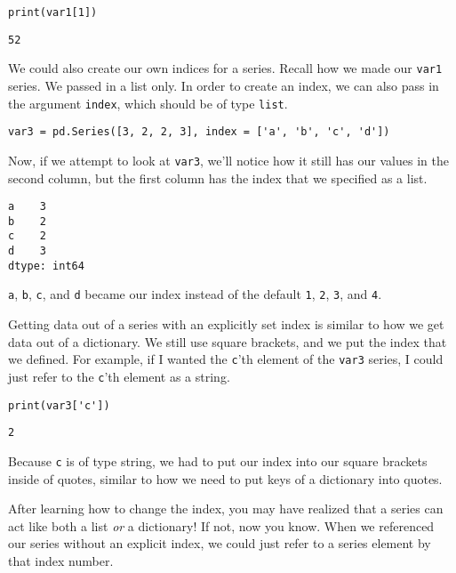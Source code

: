 \begin{lstlisting}[style=pippython]
print(var1[1])
\end{lstlisting}
\begin{lstlisting}
52
\end{lstlisting}\par
{}\par
We could also create our own indices for a series. Recall how we made our \verb|var1| series. We passed in a list only. In order to create an index, we can also pass in the argument \verb|index|, which should be of type \verb|list|.\par
\begin{lstlisting}[style=pippython]
var3 = pd.Series([3, 2, 2, 3], index = ['a', 'b', 'c', 'd'])
\end{lstlisting}
Now, if we attempt to look at \verb|var3|, we'll notice how it still has our values in the second column, but the first column has the index that we specified as a list.\par
\begin{lstlisting}
a    3
b    2
c    2
d    3
dtype: int64
\end{lstlisting}
\verb|a|, \verb|b|, \verb|c|, and \verb|d| became our index instead of the default \verb|1|, \verb|2|, \verb|3|, and \verb|4|.\par
{}
Getting data out of a series with an explicitly set index is similar to how we get data out of a dictionary. We still use square brackets, and we put the index that we defined. For example, if I wanted the \verb|c|'th element of the \verb|var3| series, I could just refer to the \verb|c|'th element as a string.\par
\begin{lstlisting}[style=pippython]
print(var3['c'])
\end{lstlisting}
\begin{lstlisting}
2
\end{lstlisting}
Because \verb|c| is of type string, we had to put our index into our square brackets inside of quotes, similar to how we need to put keys of a dictionary into quotes.\par
After learning how to change the index, you may have realized that a series can act like both a list \textit{or} a dictionary! If not, now you know. When we referenced our series without an explicit index, we could just refer to a series element by that index number.
